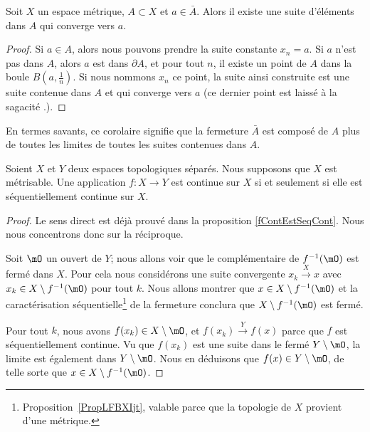 \begin{corollary}		\label{CorAdhEstLim}
	Soit \( X\) un espace métrique, \( A \subset X\) et \( a \in \bar A\). Alors il existe une suite d'éléments dans \( A\) qui converge vers \( a\).
\end{corollary}

\begin{proof}
	Si \( a\in A\), alors nous pouvons prendre la suite constante \( x_n=a\). Si \( a\) n'est pas dans \( A\), alors \( a\) est dans \( \partial A\), et pour tout \( n\), il existe un point de \( A\) dans la boule \( B(a,\frac{1}{ n })\). Si nous nommons \( x_n\) ce point, la suite ainsi construite est une suite contenue dans \( A\) et qui converge vers \( a\) (ce dernier point est laissé à la sagacité .).
\end{proof}

En termes savants, ce corolaire signifie que la fermeture \( \bar A\) est composé de \( A\) plus de toutes les limites de toutes les suites contenues dans \( A\).

\begin{proposition}     \label{PropXIAQSXr}
	Soient \( X\) et \( Y\) deux espaces topologiques séparés. Nous supposons que \( X\) est métrisable. Une application \( f\colon X\to Y\) est continue sur \( X\) si et seulement si elle est séquentiellement continue sur \( X\).
\end{proposition}

\begin{proof}
	Le sens direct est déjà prouvé dans la proposition \ref{fContEstSeqCont}. Nous nous concentrons donc sur la réciproque.

	Soit \( \mO\) un ouvert de \( Y\); nous allons voir que le complémentaire de \( f^{-1}(\mO)\) est fermé dans \( X\). Pour cela nous considérons une suite convergente \( x_k\stackrel{X}{\longrightarrow} x\) avec \( x_k\in X\setminus f^{-1}(\mO)\) pour tout \( k\). Nous allons montrer que \( x\in X\setminus f^{-1}(\mO)\) et la caractérisation séquentielle\footnote{Proposition~\ref{PropLFBXIjt}, valable parce que la topologie de \( X\) provient d'une métrique.} de la fermeture conclura que \( X\setminus f^{-1}(\mO)\) est fermé.

	Pour tout \( k\), nous avons \( f(x_k)\in X\setminus \mO\), et \( f(x_k)\stackrel{Y}{\longrightarrow} f(x)\) parce que \( f\) est séquentiellement continue. Vu que \( f(x_k)\) est une suite dans le fermé \( Y\setminus \mO\), la limite est également dans \( Y\setminus \mO\). Nous en déduisons que \( f(x)\in Y\setminus \mO\), de telle sorte que \( x\in X\setminus f^{-1}(\mO)\).
\end{proof}

